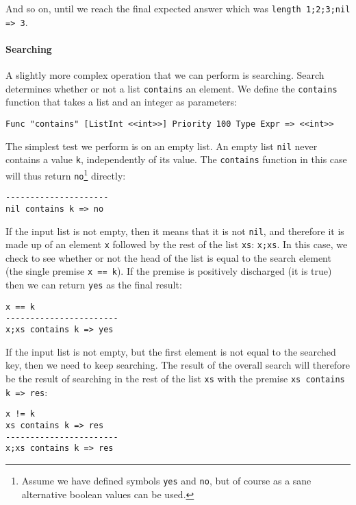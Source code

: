 And so on, until we reach the final expected answer which was \texttt{length 1;2;3;nil => 3}.


\paragraph{Searching}
A slightly more complex operation that we can perform is searching. Search determines whether or not a list \texttt{contains} an element. We define the \texttt{contains} function that takes a list and an integer as parameters:

\begin{lstlisting}
Func "contains" [ListInt <<int>>] Priority 100 Type Expr => <<int>>
\end{lstlisting}

The simplest test we perform is on an empty list. An empty list \texttt{nil} never contains a value \texttt{k}, independently of its value. The \texttt{contains} function in this case will thus return \texttt{no}\footnote{Assume we have defined symbols \texttt{yes} and \texttt{no}, but of course as a sane alternative boolean values can be used.} directly:

\begin{lstlisting}
---------------------
nil contains k => no
\end{lstlisting}

If the input list is not empty, then it means that it is not \texttt{nil}, and therefore it is made up of an element \texttt{x} followed by the rest of the list \texttt{xs}: \texttt{x;xs}. In this case, we check to see whether or not the head of the list is equal to the search element (the single premise \texttt{x == k}). If the premise is positively discharged (it is true) then we can return \texttt{yes} as the final result:

\begin{lstlisting}
x == k
-----------------------
x;xs contains k => yes
\end{lstlisting}

If the input list is not empty, but the first element is not equal to the searched key, then we need to keep searching. The result of the overall search will therefore be the result of searching in the rest of the list \texttt{xs} with the premise \texttt{xs contains k => res}:

\begin{lstlisting}
x != k
xs contains k => res
-----------------------
x;xs contains k => res
\end{lstlisting}


